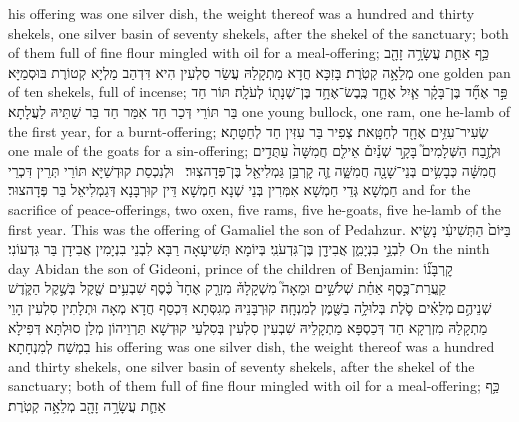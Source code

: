 {his offering was one silver dish, the weight thereof was a hundred and thirty shekels, one silver basin of seventy shekels, after the shekel of the sanctuary; both of them full of fine flour mingled with oil for a meal-offering;}{}
{כַּ֥ף אַחַ֛ת עֲשָׂרָ֥ה זָהָ֖ב מְלֵאָ֥ה קְטֹֽרֶת׃}
{בָּזִכָּא חֲדָא מַתְקָלַהּ עֲשַׂר סִלְעִין הִיא דִּדְהַב מַלְיָא קְטוֹרֶת בּוּסְמַיָּא׃}
{one golden pan of ten shekels, full of incense;}{}
{פַּ֣ר אֶחָ֞ד בֶּן־בָּקָ֗ר אַ֧יִל אֶחָ֛ד כֶּֽבֶשׂ־אֶחָ֥ד בֶּן־שְׁנָת֖וֹ לְעֹלָֽה׃}
{תּוֹר חַד בַּר תּוֹרֵי דְּכַר חַד אִמַּר חַד בַּר שַׁתֵּיהּ לַעֲלָתָא׃}
{one young bullock, one ram, one he-lamb of the first year, for a burnt-offering;}{}
{שְׂעִיר־עִזִּ֥ים אֶחָ֖ד לְחַטָּֽאת׃}
{צְפִיר בַּר עִזִּין חַד לְחַטָּתָא׃}
{one male of the goats for a sin-offering;}{}
{וּלְזֶ֣בַח הַשְּׁלָמִים֮ בָּקָ֣ר שְׁנַ֒יִם֒ אֵילִ֤ם חֲמִשָּׁה֙ עַתֻּדִ֣ים חֲמִשָּׁ֔ה כְּבָשִׂ֥ים בְּנֵי־שָׁנָ֖ה חֲמִשָּׁ֑ה זֶ֛ה קׇרְבַּ֥ן גַּמְלִיאֵ֖ל בֶּן־פְּדָהצֽוּר׃ \petucha }
{וּלְנִכְסַת קוּדְשַׁיָּא תּוֹרֵי תְּרֵין דִּכְרֵי חַמְשָׁא גְּדֵי חַמְשָׁא אִמְּרִין בְּנֵי שְׁנָא חַמְשָׁא דֵּין קוּרְבָּנָא דְּגַמְלִיאֵל בַּר פְּדָהצוּר׃}
{and for the sacrifice of peace-offerings, two oxen, five rams, five he-goats, five he-lamb of the first year. This was the offering of Gamaliel the son of Pedahzur.}{}
{בַּיּוֹם֙ הַתְּשִׁיעִ֔י נָשִׂ֖יא לִבְנֵ֣י בִנְיָמִ֑ן אֲבִידָ֖ן בֶּן־גִּדְעֹנִֽי׃}
{בְּיוֹמָא תְּשִׁיעָאָה רַבָּא לִבְנֵי בִנְיָמִין אֲבִידָן בַּר גִּדְעוֹנִי׃}
{On the ninth day Abidan the son of Gideoni, prince of the children of Benjamin:}{}
{קׇרְבָּנ֞וֹ קַֽעֲרַת־כֶּ֣סֶף אַחַ֗ת שְׁלֹשִׁ֣ים וּמֵאָה֮ מִשְׁקָלָהּ֒ מִזְרָ֤ק אֶחָד֙ כֶּ֔סֶף שִׁבְעִ֥ים שֶׁ֖קֶל בְּשֶׁ֣קֶל הַקֹּ֑דֶשׁ שְׁנֵיהֶ֣ם \legarmeh  מְלֵאִ֗ים סֹ֛לֶת בְּלוּלָ֥ה בַשֶּׁ֖מֶן לְמִנְחָֽה׃}
{קוּרְבָּנֵיהּ מְגִסְּתָא דִּכְסַף חֲדָא מְאָה וּתְלָתִין סִלְעִין הָוֵי מַתְקָלַהּ מִזְרְקָא חַד דְּכַסְפָּא מַתְקָלֵיהּ שִׁבְעִין סִלְעִין בְּסִלְעֵי קוּדְשָׁא תַּרְוֵיהוֹן מְלַן סוּלְתָּא דְּפִילָא בִמְשַׁח לְמִנְחָתָא׃}
{his offering was one silver dish, the weight thereof was a hundred and thirty shekels, one silver basin of seventy shekels, after the shekel of the sanctuary; both of them full of fine flour mingled with oil for a meal-offering;}{}
{כַּ֥ף אַחַ֛ת עֲשָׂרָ֥ה זָהָ֖ב מְלֵאָ֥ה קְטֹֽרֶת׃}
